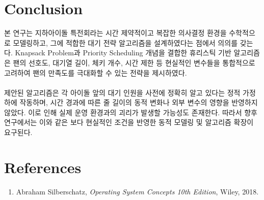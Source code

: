 \documentclass[12pt,hidelinks]{article}
\begin{document}
\section{Conclusion}
본 연구는 지하아이돌 특전회라는 시간 제약적이고 복잡한 의사결정 환경을 수학적으로 모델링하고, 그에 적합한 대기 전략 알고리즘을 설계하였다는 점에서 의의를 갖는다. Knapsack Problem과 Priority Scheduling 개념을 결합한 휴리스틱 기반 알고리즘은 팬의 선호도, 대기열 길이, 체키 개수, 시간 제한 등 현실적인 변수들을 통합적으로 고려하여 팬의 만족도를 극대화할 수 있는 전략을 제시하였다.
\\
\\
제안된 알고리즘은 각 아이돌 앞의 대기 인원을 사전에 정확히 알고 있다는 정적 가정 하에 작동하며, 시간 경과에 따른 줄 길이의 동적 변화나 외부 변수의 영향을 반영하지 않았다. 이로 인해 실제 운영 환경과의 괴리가 발생할 가능성도 존재한다. 따라서 향후 연구에서는 이와 같은 보다 현실적인 조건을 반영한 동적 모델링 및 알고리즘 확장이 요구된다.

\section{References}
\begin{enumerate}
	\item Abraham Silberschatz, \textit{Operating System Concepts 10th Edition}, Wiley, 2018.
\end{enumerate}
\end{document}
